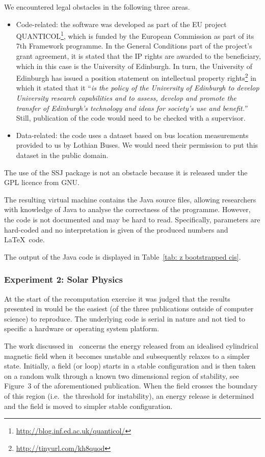 We encountered legal obstacles in the following three areas.
\begin{itemize} 
\item Code-related: the software was developed as part of the EU project
QUANTICOL\footnote{\url{http://blog.inf.ed.ac.uk/quanticol/}}, which is funded by the European Commission as part of its 7th
Framework programme. In the General Conditions part of the project's grant
agreement, it is stated that the IP rights are awarded to the beneficiary, which
in this case is the University of Edinburgh. In turn, the University of
Edinburgh has issued a position statement on intellectual property
rights\footnote{\url{http://tinyurl.com/kh8quod}} in which it stated that it ``\emph{is the policy of the University of Edinburgh to develop University research capabilities and to assess, develop and promote the transfer of Edinburgh's technology and ideas for society's use and benefit.}'' Still, publication of the code would need to be checked with a supervisor.
\item Data-related: the code uses a dataset based on bus location measurements provided to us by Lothian Buses. We would need their permission to put this dataset in the public domain.
\end{itemize}
The use of the SSJ package is not an obstacle because it is released under the GPL licence from GNU.

The resulting virtual machine contains the Java source files, allowing
researchers with knowledge of Java to analyse the correctness of the programme.
However, the code is not documented and may be hard to read. Specifically,
parameters are hard-coded and no interpretation is given of the produced
numbers and \LaTeX\ code.

The output of the Java code is displayed in Table~\ref{tab: z bootstrapped cis}.



\subsubsection*{Experiment 2: Solar Physics}

At the start of the recomputation exercise it was judged that the results
presented in \cite{bareford2010nanoflare} would be the easiest (of the three
publications outside of computer science) to reproduce. The underlying code is
serial in nature and not tied to specific a hardware or operating system platform. 

The work discussed in~\cite{bareford2010nanoflare} concerns the energy released
from an idealised cylindrical magnetic field when it becomes unstable and
subsequently relaxes to a simpler state. Initially, a field (or loop) starts in
a stable configuration and is then taken on a random walk through a known two
dimensional region of stability, see \mbox{Figure 3} of the aforementioned
publication. When the field crosses the boundary of this region (i.e.\ the threshold for instability), an energy release is determined and the field is moved to simpler stable configuration. 

